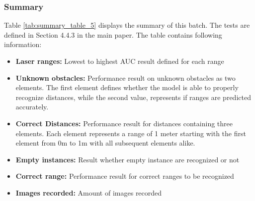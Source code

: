 \subsubsection{Summary\label{summary_batch_5} }
Table \ref{tab:summary_table_5} displays the summary of this batch. The tests are defined in Section 4.4.3 in the main paper. The table contains following information:
\begin{itemize}
\item  \textbf{Laser ranges: }Lowest to highest AUC result defined for each range
\item  \textbf{Unknown obstacles: }Performance result on unknown obstacles as two elements. The first element defines whether the model is able to properly recognize distances, while the second value, represents if ranges are predicted accurately.
\item  \textbf{Correct Distances: }Performance result for distances containing three elements. Each element represents a range of 1 meter starting with the first element from 0m to 1m with all subsequent elements alike.
\item  \textbf{Empty instances: }Result whether empty instance are recognized or not
\item  \textbf{Correct range: }Performance result for correct ranges to be recognized
\item  \textbf{Images recorded: }Amount of images recorded
\end{itemize}


